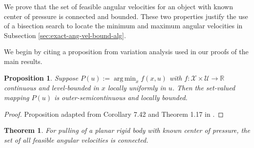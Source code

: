 \documentclass[conference]{IEEEtran}
\newtheorem{theorem}{Theorem}
\newtheorem{proposition}{Proposition}
\DeclareMathOperator*{\argmin}{arg\,min}
\begin{document}

We prove that the set of feasible angular velocities for an object
with known center of pressure is connected and bounded. These two
properties justify the use of a bisection search to locate the minimum
and maximum angular velocities in Subsection
\ref{sec:exact-ang-vel-bound-alg}.

We begin by citing a proposition from variation analysis used in our
proofs of the main results.
\begin{proposition}\label{prop:var-analysis}
  Suppose $P(u) := \argmin_x f(x,u)$ with
  $f:\mathcal{X}\times\mathcal{U}\rightarrow\mathbb{R}$ continuous and
  level-bounded in $x$ locally uniformly in $u$. Then the set-valued
  mapping $P(u)$ is outer-semicontinuous and locally bounded.
\end{proposition}

\begin{proof}
  Proposition adapted from Corollary 7.42 and Theorem 1.17 in
  \cite{Rockafellar}.
\end{proof}

\begin{theorem}\label{thm:angular-velocities}
  For pulling of a planar rigid body with known center of pressure,
  the set of all feasible angular velocities is connected.
\end{theorem}
\end{document}

